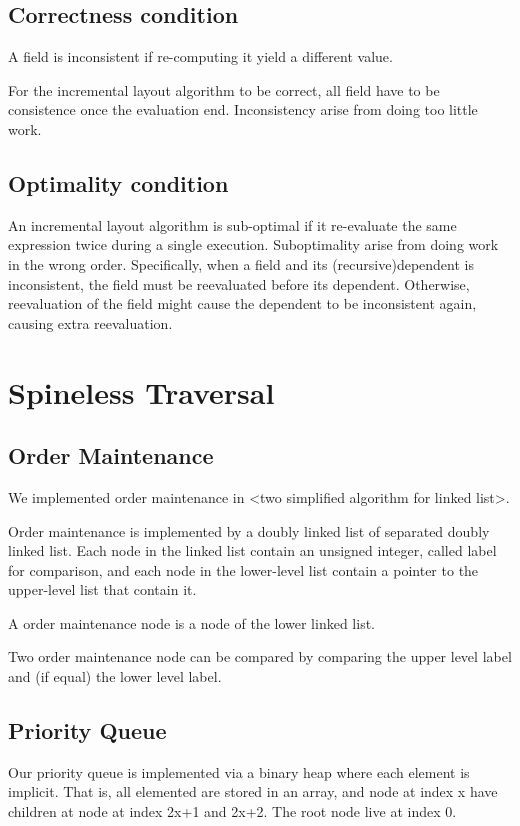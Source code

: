 \documentclass[format=acmsmall, review=false, screen=true]{acmart}
\begin{document}
\subsection{Correctness condition}
A field is inconsistent if re-computing it yield a different value.

For the incremental layout algorithm to be correct, all field have to be consistence once the evaluation end. Inconsistency arise from doing too little work.

\subsection{Optimality condition}
An incremental layout algorithm is sub-optimal if it re-evaluate the same expression twice during a single execution. Suboptimality arise from doing work in the wrong order. Specifically, when a field and its (recursive)dependent is inconsistent, the field must be reevaluated before its dependent. Otherwise, reevaluation of the field might cause the dependent to be inconsistent again, causing extra reevaluation.

\section{Spineless Traversal}
\subsection{Order Maintenance}
We implemented order maintenance in <two simplified algorithm for linked list>.

Order maintenance is implemented by a doubly linked list of separated doubly linked list. Each node in the linked list contain an unsigned integer, called label for comparison, and each node in the lower-level list contain a pointer to the upper-level list that contain it.

A order maintenance node is a node of the lower linked list.

Two order maintenance node can be compared by comparing the upper level label and (if equal) the lower level label.

\subsection{Priority Queue}
Our priority queue is implemented via a binary heap where each element is implicit. That is, all elemented are stored in an array, and node at index x have children at node at index 2x+1 and 2x+2. The root node live at index 0.
\end{document}
